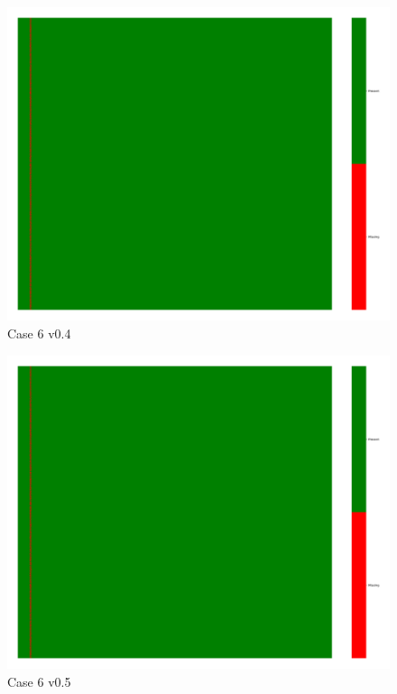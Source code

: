 \documentclass[a4paper,12pt]{article}
\begin{document}
\begin{figure}[H]
    \includegraphics[width=\linewidth]{case6_v0.4_heatmap_cleaned.png}
    \caption*{Case 6 v0.4}
\end{figure}

\begin{figure}[H]
    \includegraphics[width=\linewidth]{case6_v0.5_heatmap_cleaned.png}
    \caption*{Case 6 v0.5}
\end{figure}
\end{document}
